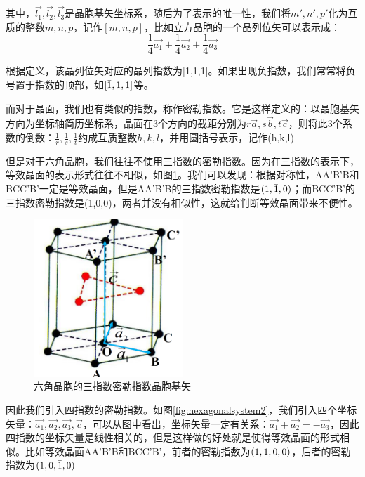 \documentclass{ctexart}
\begin{document}
    其中，$\Vec{l_1},\Vec{l_2},\Vec{l_3}$是晶胞基矢坐标系，随后为了表示的唯一性，我们将$m',n',p'$化为互质的整数$m,n,p$，记作$[m,n,p]$，比如立方晶胞的一个晶列位矢可以表示成：
    \begin{equation}
        \frac{1}{4}\Vec{a_1}+\frac{1}{4}\Vec{a_2}+\frac{1}{4}\Vec{a_3}
    \end{equation}
    
    根据定义，该晶列位矢对应的晶列指数为[1,1,1]。如果出现负指数，我们常常将负号置于指数的顶部，如$[\Bar{1},1,1]$等。

    而对于晶面，我们也有类似的指数，称作密勒指数。它是这样定义的：以晶胞基矢方向为坐标轴简历坐标系，晶面在3个方向的截距分别为$r\Vec{a},s\Vec{b},t\Vec{c}$，则将此3个系数的倒数：$\frac{1}{r},\frac{1}{s},\frac{1}{t}$约成互质整数$h,k,l$，并用圆括号表示，记作(h,k,l)
    
    但是对于六角晶胞，我们往往不使用三指数的密勒指数。因为在三指数的表示下，等效晶面的表示形式往往不相似，如图\ref{fig:hexagonalsystem1}。我们可以发现：根据对称性，AA'B'B和BCC'B'一定是等效晶面，但是AA'B'B的三指数密勒指数是$(1,\Bar{1},0)$；而BCC'B'的三指数密勒指数是(1,0,0)，两者并没有相似性，这就给判断等效晶面带来不便性。
    \begin{figure}[H]
        \centering
        \includegraphics[width=0.5\textwidth]{figure/Hexagonal system.png}
        \caption{六角晶胞的三指数密勒指数晶胞基矢}
        \label{fig:hexagonalsystem1}
    \end{figure}
    
    因此我们引入四指数的密勒指数。如图\ref{fig:hexagonalsystem2}，我们引入四个坐标矢量：$\Vec{a_1},\Vec{a_2},\Vec{a_3},\Vec{c}$，可以从图中看出，坐标矢量一定有关系：$\Vec{a_1}+\Vec{a_2}=-\Vec{a_3}$，因此四指数的坐标矢量是线性相关的，但是这样做的好处就是使得等效晶面的形式相似。比如等效晶面AA'B'B和BCC'B'，前者的密勒指数为$(1,\Bar{1},0,0)$，后者的密勒指数为$(1,0,\Bar{1},0)$
    
\end{document}
